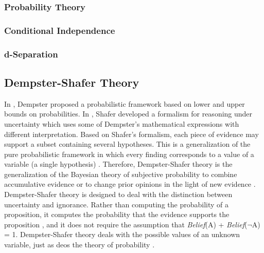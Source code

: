 \documentclass[11pt]{article}
\begin{document}
\subsubsection{Probability Theory}

\subsubsection{Conditional Independence}



\subsubsection{d-Separation}

\subsection{Dempster-Shafer Theory}

In \cite{dempster:theory}, Dempster proposed a probabilistic framework based on
lower and upper bounds on probabilities. In \cite{shafer:evidence-theory},
Shafer developed a formalism for reasoning under uncertainty which uses some of
Dempster's mathematical expressions with different interpretation. Based on
Shafer's formalism, each piece of evidence may support a subset containing
several hypotheses. This is a generalization of the pure probabilistic framework
in which every finding corresponds to a value of a variable (a single
hypothesis) \cite{diez:reasoning-uncertainty}. Therefore, Dempster-Shafer theory
is the generalization of the Bayesian theory of subjective probability to
combine accumulative evidence or to change prior opinions in the light of new
evidence \cite{das:decision-making-agents}. Dempster-Shafer theory is designed
to deal with the distinction between uncertainty and ignorance. Rather than
computing the probability of a proposition, it computes the probability that the
evidence supports the proposition \cite{russell:ai-modern}, and it does not
require the assumption that \textit{Belief}(A) + \textit{Belief}($\neg$A) = 1.
Dempster-Shafer theory deals with the possible values of an unknown variable,
just as deos the theory of probability \cite{tanimoto:ai-lisp}.
\end{document}
